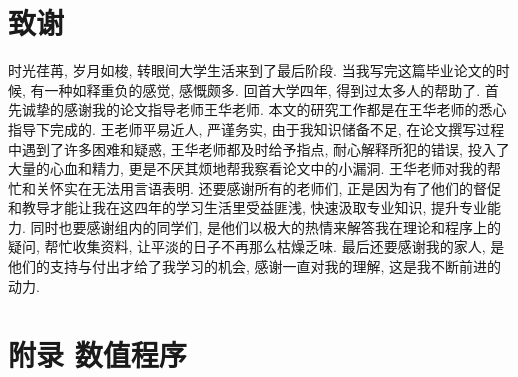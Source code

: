 \documentclass[a4paper,UTF8,titlepage]{ctexart}
\begin{document}
\newpage

\section*{致谢}

时光荏苒, 岁月如梭, 转眼间大学生活来到了最后阶段. 当我写完这篇毕业论文的时候, 有一种如释重负的感觉, 感慨颇多. 回首大学四年, 得到过太多人的帮助了. 首先诚挚的感谢我的论文指导老师王华老师. 本文的研究工作都是在王华老师的悉心指导下完成的. 王老师平易近人, 严谨务实, 由于我知识储备不足, 在论文撰写过程中遇到了许多困难和疑惑, 王华老师都及时给予指点, 耐心解释所犯的错误, 投入了大量的心血和精力, 更是不厌其烦地帮我察看论文中的小漏洞. 王华老师对我的帮忙和关怀实在无法用言语表明. 还要感谢所有的老师们, 正是因为有了他们的督促和教导才能让我在这四年的学习生活里受益匪浅, 快速汲取专业知识, 提升专业能力. 同时也要感谢组内的同学们, 是他们以极大的热情来解答我在理论和程序上的疑问, 帮忙收集资料, 让平淡的日子不再那么枯燥乏味. 最后还要感谢我的家人, 是他们的支持与付出才给了我学习的机会, 感谢一直对我的理解, 这是我不断前进的动力. 

\newpage

\appendix
\section{附录 数值程序}




\end{document}
